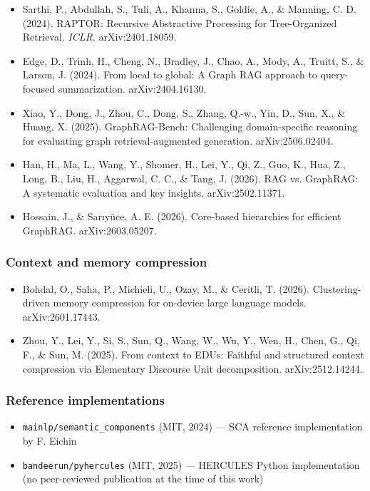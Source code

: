 \documentclass[
]{article}
\providecommand{\tightlist}{%
  \setlength{\itemsep}{0pt}\setlength{\parskip}{0pt}}
\begin{document}
\begin{itemize}
\tightlist
\item
  Sarthi, P., Abdullah, S., Tuli, A., Khanna, S., Goldie, A., \&
  Manning, C. D. (2024). RAPTOR: Recursive Abstractive Processing for
  Tree-Organized Retrieval. \emph{ICLR}. arXiv:2401.18059.
\item
  Edge, D., Trinh, H., Cheng, N., Bradley, J., Chao, A., Mody, A.,
  Truitt, S., \& Larson, J. (2024). From local to global: A Graph RAG
  approach to query-focused summarization. arXiv:2404.16130.
\item
  Xiao, Y., Dong, J., Zhou, C., Dong, S., Zhang, Q.-w., Yin, D., Sun,
  X., \& Huang, X. (2025). GraphRAG-Bench: Challenging domain-specific
  reasoning for evaluating graph retrieval-augmented generation.
  arXiv:2506.02404.
\item
  Han, H., Ma, L., Wang, Y., Shomer, H., Lei, Y., Qi, Z., Guo, K., Hua,
  Z., Long, B., Liu, H., Aggarwal, C. C., \& Tang, J. (2026). RAG vs.
  GraphRAG: A systematic evaluation and key insights. arXiv:2502.11371.
\item
  Hossain, J., \& Sarıyüce, A. E. (2026). Core-based hierarchies for
  efficient GraphRAG. arXiv:2603.05207.
\end{itemize}

\subsubsection{Context and memory
compression}\label{context-and-memory-compression}

\begin{itemize}
\tightlist
\item
  Bohdal, O., Saha, P., Michieli, U., Ozay, M., \& Ceritli, T. (2026).
  Clustering-driven memory compression for on-device large language
  models. arXiv:2601.17443.
\item
  Zhou, Y., Lei, Y., Si, S., Sun, Q., Wang, W., Wu, Y., Wen, H., Chen,
  G., Qi, F., \& Sun, M. (2025). From context to EDUs: Faithful and
  structured context compression via Elementary Discourse Unit
  decomposition. arXiv:2512.14244.
\end{itemize}

\subsubsection{Reference
implementations}\label{reference-implementations}

\begin{itemize}
\tightlist
\item
  \texttt{mainlp/semantic\_components} (MIT, 2024) --- SCA reference
  implementation by F. Eichin
\item
  \texttt{bandeerun/pyhercules} (MIT, 2025) --- HERCULES Python
  implementation (no peer-reviewed publication at the time of this work)
\end{itemize}
\end{document}
